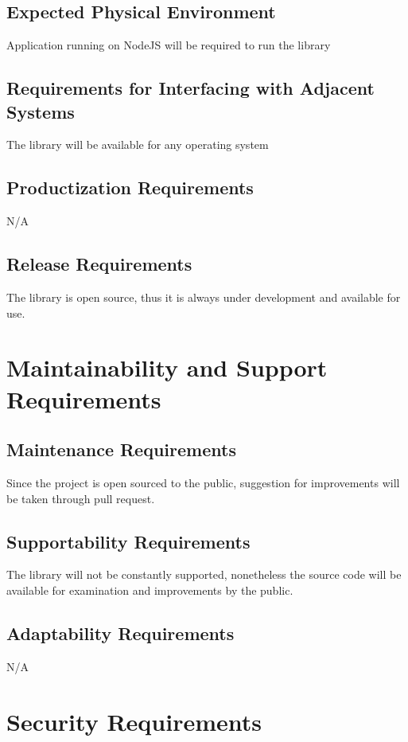 \documentclass[12pt]{article}
\begin{document}
\subsection {Expected Physical Environment}
Application running on NodeJS will be required to run the library

\subsection {Requirements for Interfacing with Adjacent Systems}
The library will be available for any operating system

\subsection {Productization Requirements}
N/A

\subsection {Release Requirements}
The library is open source, thus it is always under development and available for use.

\section {Maintainability and Support Requirements}

\subsection {Maintenance Requirements}
Since the project is open sourced to the public, suggestion for improvements will be taken through pull request.

\subsection {Supportability Requirements}
The library will not be constantly supported, nonetheless the source code will be available for examination and improvements by the public.

\subsection {Adaptability Requirements}
N/A

\section {Security Requirements}
\end{document}
